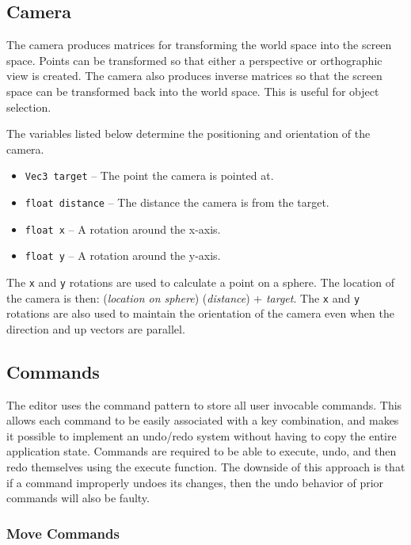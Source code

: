 \documentclass[11pt,letterpaper]{article}
\begin{document}
\subsection{Camera}

The camera produces matrices for transforming the world space into the screen space. Points can be transformed so that either a perspective or orthographic view is created. The camera also produces inverse matrices so that the screen space can be transformed back into the world space. This is useful for object selection.

The variables listed below determine the positioning and orientation of the camera.
\begin{itemize}
\item \texttt{Vec3 target} -- The point the camera is pointed at.
\item \texttt{float distance} -- The distance the camera is from the target.
\item \texttt{float x} -- A rotation around the x-axis.
\item \texttt{float y} -- A rotation around the y-axis.
\end{itemize}

The \texttt{x} and \texttt{y} rotations are used to calculate a point on a sphere. The location of the camera is then: (\textit{location on sphere}) (\textit{distance}) +  \textit{target}. The \texttt{x} and \texttt{y} rotations are also used to maintain the orientation of the camera even when the direction and up vectors are parallel.

\subsection{Commands}

The editor uses the command pattern to store all user invocable commands. This allows each command to be easily associated with a key combination, and makes it possible to implement an undo/redo system without having to copy the entire application state. Commands are required to be able to execute, undo, and then redo themselves using the execute function. The downside of this approach is that if a command improperly undoes its changes, then the undo behavior of prior commands will also be faulty.

\subsubsection{Move Commands}
\end{document}

